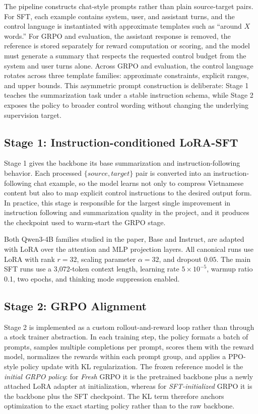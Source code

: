 \documentclass[11pt]{article}
\begin{document}
The pipeline constructs chat-style prompts rather than plain source-target
pairs. For SFT, each example contains system, user, and assistant turns, and
the control language is instantiated with approximate templates such as
``around $X$ words.'' For GRPO and evaluation, the assistant response is
removed, the reference is stored separately for reward computation or scoring,
and the model must generate a summary that respects the requested control
budget from the system and user turns alone. Across GRPO and evaluation, the
control language rotates across three template families: approximate
constraints, explicit ranges, and upper bounds. This asymmetric prompt
construction is deliberate: Stage 1 teaches the summarization task under a
stable instruction schema, while Stage 2 exposes the policy to broader control
wording without changing the underlying supervision target.

\subsection{Stage 1: Instruction-conditioned LoRA-SFT}
Stage 1 gives the backbone its base summarization and instruction-following
behavior. Each processed $\{source, target\}$ pair is converted into an
instruction-following chat example, so the model learns not only to compress
Vietnamese content but also to map explicit control instructions to the
desired output form. In practice, this stage is responsible for the largest
single improvement in instruction following and summarization quality in the
project, and it produces the checkpoint used to warm-start the GRPO stage.

Both Qwen3-4B families studied in the paper, Base and Instruct, are adapted
with LoRA over the attention and MLP projection layers. All canonical runs use
LoRA with rank $r = 32$, scaling parameter $\alpha = 32$, and dropout $0.05$. The main SFT
runs use a 3,072-token context length, learning rate $5\times10^{-5}$,
warmup ratio 0.1, two epochs, and thinking mode suppression enabled.

\subsection{Stage 2: GRPO Alignment}
Stage 2 is implemented as a custom rollout-and-reward loop rather than
through a stock trainer abstraction. In each training step, the policy formats
a batch of prompts, samples multiple completions per prompt, scores them with
the reward model, normalizes the rewards within each prompt group, and applies
a PPO-style policy update with KL regularization. The frozen reference model
is the \emph{initial GRPO policy}: for \emph{Fresh} GRPO it is the pretrained
backbone plus a newly attached LoRA adapter at initialization, whereas for
\emph{SFT-initialized} GRPO it is the backbone plus the SFT checkpoint. The
KL term therefore anchors optimization to the exact starting policy rather
than to the raw backbone.
\end{document}
